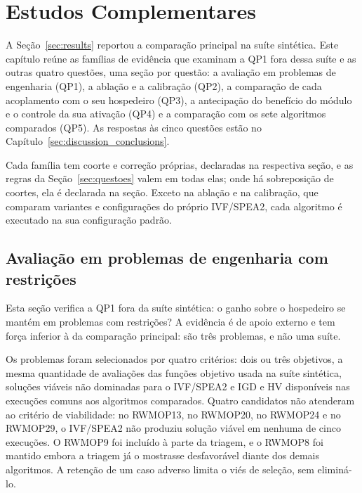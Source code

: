 \chapter{Estudos Complementares}
\label{sec:complementares}

A Seção~\ref{sec:results} reportou a comparação principal na suíte sintética. Este capítulo reúne as famílias de evidência que examinam a QP1 fora dessa suíte e as outras quatro questões, uma seção por questão: a avaliação em problemas de engenharia (QP1), a ablação e a calibração (QP2), a comparação de cada acoplamento com o seu hospedeiro (QP3), a antecipação do benefício do módulo e o controle da sua ativação (QP4) e a comparação com os sete algoritmos comparados (QP5). As respostas às cinco questões estão no Capítulo~\ref{sec:discussion_conclusions}.

Cada família tem coorte e correção próprias, declaradas na respectiva seção, e as regras da Seção~\ref{sec:questoes} valem em todas elas; onde há sobreposição de coortes, ela é declarada na seção. Exceto na ablação e na calibração, que comparam variantes e configurações do próprio IVF/SPEA2, cada algoritmo é executado na sua configuração padrão.

\section{Avaliação em problemas de engenharia com restrições}
\label{sec:engenharia}

Esta seção verifica a QP1 fora da suíte sintética: o ganho sobre o hospedeiro se mantém em problemas com restrições? A evidência é de apoio externo e tem força inferior à da comparação principal: são três problemas, e não uma suíte.

Os problemas foram selecionados por quatro critérios: dois ou três objetivos, a mesma quantidade de avaliações das funções objetivo usada na suíte sintética, soluções viáveis não dominadas para o IVF/SPEA2 e IGD e HV disponíveis nas execuções comuns aos algoritmos comparados. Quatro candidatos não atenderam ao critério de viabilidade: no RWMOP13, no RWMOP20, no RWMOP24 e no RWMOP29, o IVF/SPEA2 não produziu solução viável em nenhuma de cinco execuções. O RWMOP9 foi incluído à parte da triagem, e o RWMOP8 foi mantido embora a triagem já o mostrasse desfavorável diante dos demais algoritmos. A retenção de um caso adverso limita o viés de seleção, sem eliminá-lo.



